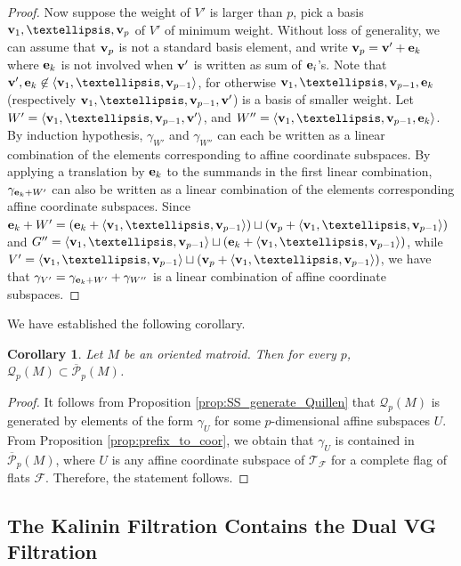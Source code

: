 \documentclass{amsart}
\newtheorem{corollary}[theorem]{Corollary}
\newcommand\Fcal{{\mathcal F}}
\newcommand\Qcal{{\mathcal Q}}
\newcommand\Pcal{{\mathcal P}}
\newcommand\Tcal{{\mathcal T}}
\newcommand\ee{{\bf e}}
\newcommand\vv{{\bf v}}
\begin{document}
{\begin{proof}
Now suppose the weight of $V'$ is larger than $p$, pick a basis $\vv_1,\ldots,\vv_p$ of $V'$ of minimum weight.
Without loss of generality, we can assume that $\vv_p$ is not a standard basis element, and write $\vv_p=\vv' + \ee_k$ where $\ee_k$ is not involved when $\vv'$ is written as sum of $\ee_i$'s.
Note that $\vv',\ee_k\not\in\langle\vv_1,\ldots,\vv_{p-1} \rangle$, for otherwise $\vv_1,\ldots,\vv_{p-1},\ee_k$ (respectively $\vv_1,\ldots,\vv_{p-1},\vv'$) is a basis of smaller weight.
Let $W'=\langle\vv_1,\ldots,\vv_{p-1},\vv' \rangle$, and $W''=\langle\vv_1,\ldots,\vv_{p-1},\ee_k \rangle$.
By induction hypothesis, $\gamma_{W'}$ and $\gamma_{W''}$ can each be written as a linear combination of the elements corresponding to affine coordinate subspaces.
By applying a translation by $\ee_k$ to the summands in the first linear combination, $\gamma_{\ee_k+W'}$ can also be written as a linear combination of the elements corresponding affine coordinate subspaces.
Since $\ee_k+W' = (\ee_k+\langle\vv_1,\ldots,\vv_{p-1} \rangle) \sqcup (\vv_p+\langle\vv_1,\ldots,\vv_{p-1} \rangle)$ and $G''=\langle\vv_1,\ldots,\vv_{p-1} \rangle\sqcup (\ee_k+\langle\vv_1,\ldots,\vv_{p-1} \rangle)$, while $V'=\langle\vv_1,\ldots,\vv_{p-1} \rangle\sqcup(\vv_p+\langle\vv_1,\ldots,\vv_{p-1} \rangle)$, we have that $\gamma_{V'}=\gamma_{\ee_k+W'}+\gamma_{W''}$ is a linear combination of affine coordinate subspaces.
\end{proof}

We have established the following corollary. 

\begin{corollary} \label{coro:Quillen_in_prefix}
Let $M$ be an oriented matroid.
Then for every $p$, $\Qcal_p(M)\subset\overline{\Pcal}_p(M)$.
\end{corollary}

\begin{proof}
It follows from Proposition \ref{prop:SS_generate_Quillen} that $\Qcal_p(M)$ is generated by elements of the form $\gamma_U$ for some $p$-dimensional affine subspaces $U$. 
From Proposition \ref{prop:prefix_to_coor}, we obtain that $\gamma_U$ is contained in $\overline{\Pcal}_p(M)$, where $U$ is any affine coordinate subspace of $\Tcal_{\Fcal}$ for a complete flag of flats $\Fcal$. Therefore, the statement follows.
\end{proof}

\subsection{The Kalinin Filtration Contains the Dual VG Filtration}
\label{sec:Kalinin_prefix}

}
\end{document}
